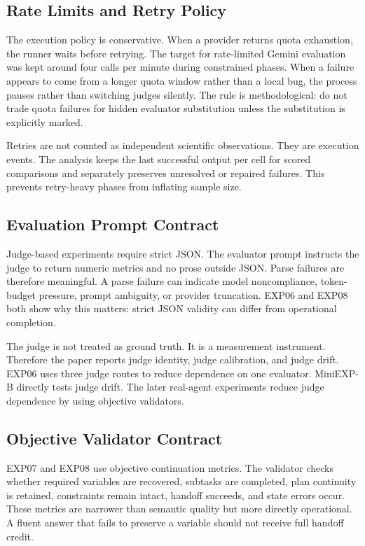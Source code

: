 \documentclass[11pt]{article}
\begin{document}
\subsection{Rate Limits and Retry Policy}
The execution policy is conservative. When a provider returns quota exhaustion, the runner waits before retrying. The target for rate-limited Gemini evaluation was kept around four calls per minute during constrained phases. When a failure appears to come from a longer quota window rather than a local bug, the process pauses rather than switching judges silently. The rule is methodological: do not trade quota failures for hidden evaluator substitution unless the substitution is explicitly marked.

Retries are not counted as independent scientific observations. They are execution events. The analysis keeps the last successful output per cell for scored comparisons and separately preserves unresolved or repaired failures. This prevents retry-heavy phases from inflating sample size.

\subsection{Evaluation Prompt Contract}
Judge-based experiments require strict JSON. The evaluator prompt instructs the judge to return numeric metrics and no prose outside JSON. Parse failures are therefore meaningful. A parse failure can indicate model noncompliance, token-budget pressure, prompt ambiguity, or provider truncation. EXP06 and EXP08 both show why this matters: strict JSON validity can differ from operational completion.

The judge is not treated as ground truth. It is a measurement instrument. Therefore the paper reports judge identity, judge calibration, and judge drift. EXP06 uses three judge routes to reduce dependence on one evaluator. MiniEXP-B directly tests judge drift. The later real-agent experiments reduce judge dependence by using objective validators.

\subsection{Objective Validator Contract}
EXP07 and EXP08 use objective continuation metrics. The validator checks whether required variables are recovered, subtasks are completed, plan continuity is retained, constraints remain intact, handoff succeeds, and state errors occur. These metrics are narrower than semantic quality but more directly operational. A fluent answer that fails to preserve a variable should not receive full handoff credit.
\end{document}
